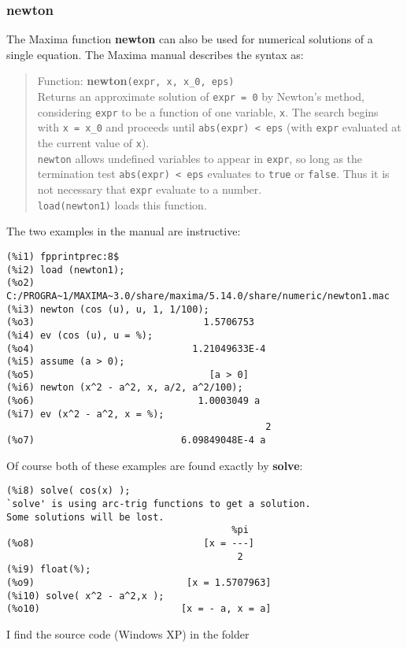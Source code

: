 \documentclass[12pt]{article}
\begin{document}
\subsubsection{newton}
The Maxima function \textbf{newton} can also be used for numerical solutions
  of a single equation.
The Maxima manual describes the syntax as:
\small
\begin{quote}
Function: \textbf{newton}\verb|(expr, x, x_0, eps) |\\
Returns an approximate solution of \verb|expr = 0| by Newton's method,
  considering \verb|expr| to be a function of one variable, \verb|x|.
The search begins with \verb|x = x_0| and proceeds until \verb|abs(expr) < eps|
  (with \verb|expr| evaluated at the current value of \verb|x|). \\
\verb|newton| allows undefined variables to appear in \verb|expr|, so
   long as the termination test \verb|abs(expr) < eps| evaluates to \verb|true|
   or \verb|false|.
Thus it is not necessary that \verb|expr| evaluate to a number. \\
\verb|load(newton1)| loads this function. 
\end{quote}
\normalsize
The two examples in the manual are instructive:
\small
\begin{verbatim}
(%i1) fpprintprec:8$
(%i2) load (newton1);
(%o2) C:/PROGRA~1/MAXIMA~3.0/share/maxima/5.14.0/share/numeric/newton1.mac
(%i3) newton (cos (u), u, 1, 1/100);
(%o3)                              1.5706753
(%i4) ev (cos (u), u = %);
(%o4)                            1.21049633E-4
(%i5) assume (a > 0);
(%o5)                               [a > 0]
(%i6) newton (x^2 - a^2, x, a/2, a^2/100);
(%o6)                             1.0003049 a
(%i7) ev (x^2 - a^2, x = %);
                                              2
(%o7)                          6.09849048E-4 a
\end{verbatim}
\normalsize
Of course both of these examples are found exactly by \textbf{solve}:
\small
\begin{verbatim}
(%i8) solve( cos(x) );
`solve' is using arc-trig functions to get a solution.
Some solutions will be lost.
                                        %pi
(%o8)                              [x = ---]
                                         2
(%i9) float(%);
(%o9)                           [x = 1.5707963]
(%i10) solve( x^2 - a^2,x );
(%o10)                         [x = - a, x = a]
\end{verbatim}
\normalsize
I find the source code (Windows XP) in the folder\\
\end{document}
